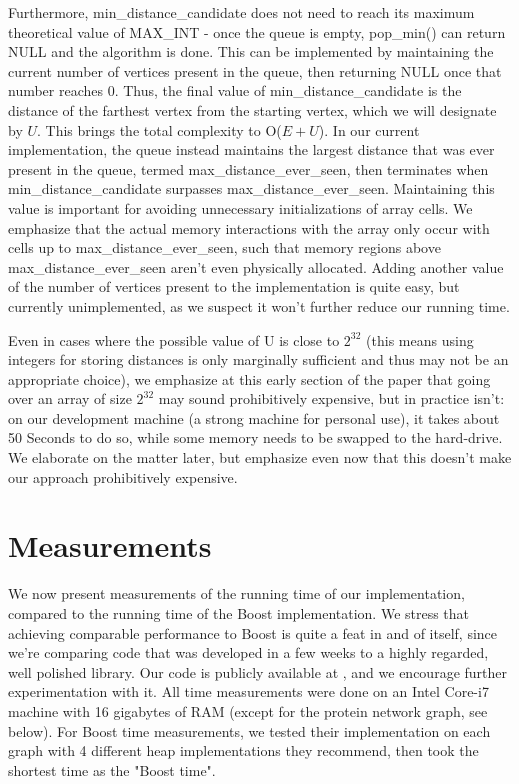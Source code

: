 \documentclass[conference,10pt,twocolumn]{IEEEtran}
\begin{document}
Furthermore, min\_distance\_candidate does not need to reach its maximum theoretical value of MAX\_INT - once the queue is empty, pop\_min() can return NULL and the algorithm is done. This can be implemented by maintaining the current number of vertices present in the queue, then returning NULL once that number reaches 0. Thus, the final value of min\_distance\_candidate is the distance of the farthest vertex from the starting vertex, which we will designate by $U$. This brings the total complexity to O($E + U$).
In our current implementation, the queue instead maintains the largest distance that was ever present in the queue, termed max\_distance\_ever\_seen, then terminates when min\_distance\_candidate surpasses max\_distance\_ever\_seen. Maintaining this value is important for avoiding unnecessary initializations of array cells. We emphasize that the actual memory interactions with the array only occur with cells up to max\_distance\_ever\_seen, such that memory regions above max\_distance\_ever\_seen aren't even physically allocated.
Adding another value of the number of vertices present to the implementation is quite easy, but currently unimplemented, as we suspect it won't further reduce our running time. 

Even in cases where the possible value of U is close to $2^{32}$ (this means using integers for storing distances is only marginally sufficient and thus may not be an appropriate choice), we emphasize at this early section of the paper that going over an array of size $2^{32}$ may sound prohibitively expensive, but in practice isn't: on our development machine (a strong machine for personal use), it takes about 50 Seconds to do so, while some memory needs to be swapped to the hard-drive. We elaborate on the matter later, but emphasize even now that this doesn't make our approach prohibitively expensive.

\section{Measurements} \label{sec:meas}


We now present measurements of the running time of our implementation, compared to the running time of the Boost implementation. We stress that achieving comparable performance to Boost is quite a feat in and of itself, since we're comparing code that was developed in a few weeks to a highly regarded, well polished library. Our code is publicly available at \cite{github}, and we encourage further experimentation with it. All time measurements were done on an Intel Core-i7 machine with 16 gigabytes of RAM (except for the protein network graph, see below). For Boost time measurements, we tested their implementation on each graph with 4 different heap implementations they recommend, then took the shortest time as the "Boost time". 
\end{document}
